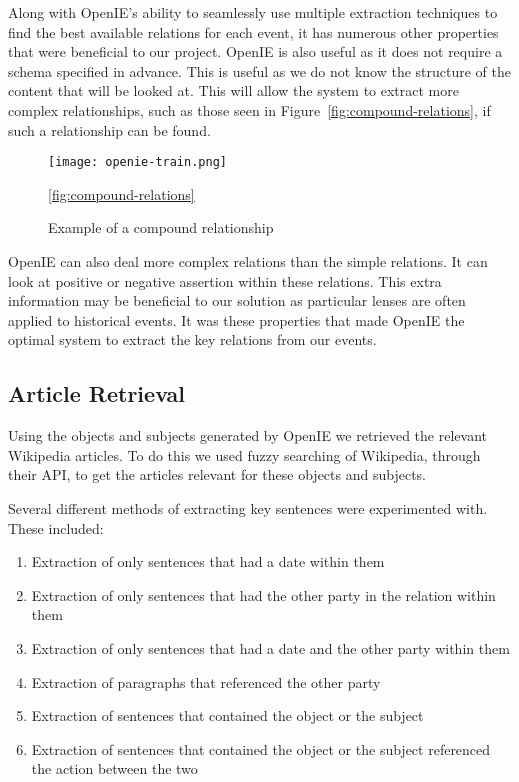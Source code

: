 \documentclass[bsc,frontabs,twoside,singlespacing,parskip,deptreport]{infthesis}     %
\begin{document}
Along with OpenIE's ability to seamlessly use multiple extraction techniques to find the best available
relations for each event, it has numerous other properties that were beneficial to our project.
OpenIE is also useful as it does not require a schema specified in advance.
This is useful as we do not know the structure of the content that will be looked at.
This will allow the system to extract
more complex relationships, such as those seen in Figure~\ref{fig:compound-relations}, if such
a relationship can be found.


\begin{figure}[h]
  \centering
  \texttt{[image: openie-train.png]}
  \caption{Example of a compound relationship ~\cite{OpenIE}}
  \ref{fig:compound-relations}
  \end{figure}

OpenIE can also deal more complex relations  than the simple relations.
It can look at positive or negative assertion within these relations.
This extra information may be beneficial to our solution as particular lenses are often applied to historical events.
It was these properties that made OpenIE the optimal system to extract the key relations from our events.


\subsection{Article Retrieval}
Using the objects and subjects generated by OpenIE we retrieved the relevant Wikipedia articles.
To do this we used fuzzy searching of Wikipedia, through their API, to get the articles relevant
for these objects and subjects.

Several different methods of extracting key sentences were experimented with.
These included:

\begin{enumerate}
  \item Extraction of only sentences that had a date within them
  \item Extraction of only sentences that had the other party in the relation within them
  \item Extraction of only sentences that had a date and the other party within them
  \item Extraction of paragraphs that referenced the other party
  \item Extraction of sentences that contained the object or the subject 
  \item Extraction of sentences that contained the object or the subject referenced the action between the two 
\end{enumerate}
\end{document}
